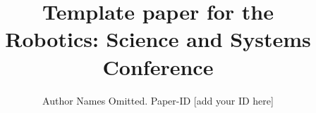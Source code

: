 \documentclass[conference]{IEEEtran} %
\begin{document}
\title{Template paper for the \\Robotics: Science and Systems Conference}

\author{Author Names Omitted. Paper-ID [add your ID here]}





%


\maketitle
\end{document}
